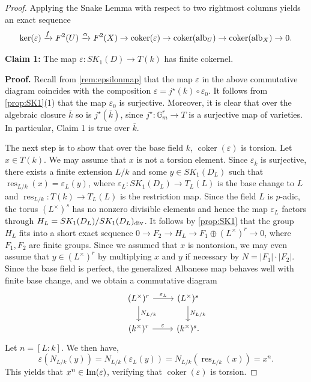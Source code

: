 \documentclass[12pt]{amsart}
\theoremstyle{remark}
\newcommand{\G}{{\mathbb G}}
\renewcommand{\1}{{\mathbb{S}}}
\newcommand{\alb}{{\rm alb}}
\newcommand{\<}{\langle}
\renewcommand{\>}{\rangle}
\newcommand{\res}{{\operatorname{res}}}
\newcommand{\cok}{{\operatorname{coker}}}
\newcommand{\img}{{\rm Im}}
\newcommand{\dv}{{\rm div}}
\begin{document}
\begin{proof}
 Applying the Snake Lemma with respect to 
two rightmost columns yields an exact sequence 
\begin{equation}\label{eq3}
\ker(\varepsilon)\xrightarrow{f} F^2(U)\xrightarrow{\alpha} F^2(X)\to\cok(\varepsilon)\to\cok(\alb_U)\to\cok(\alb_X)\to 0.
\end{equation}


\textbf{Claim 1:} The map $\varepsilon: SK_1(D)\to T(k)$ has finite cokernel. 



\textbf{Proof.} 
Recall from \autoref{rem:epsilonmap} that the map $\varepsilon$ in the above commutative diagram coincides with the composition $\varepsilon=j^\star(k)\circ\varepsilon_0$. It follows from \autoref{prop:SK1}(1) that the map $\varepsilon_0$ is surjective. Moreover, it is clear that over the algebraic closure $\overline{k}$ so is $j^\star(\overline{k})$, since $j^\star:\G_m^{r}\to T$ is a surjective map of varieties. In particular,  Claim 1 is true over $\overline{k}$.


The next step is to show that over the base field $k$, $\cok(\varepsilon)$ is torsion. Let $x\in T(k)$. We may assume that $x$ is not a torsion element. 
Since $\varepsilon_{\overline{k}}$ is surjective, there exists a finite extension $L/k$ and some $y\in SK_1(D_L)$ such that $\res_{L/k}(x)=\varepsilon_L(y)$, where $\varepsilon_L:SK_1(D_L)\to T_L(L)$ is the base change to $L$ and $\res_{L/k}:T(k)\to T_L(L)$ is the restriction map. 
Since the field $L$ is $p$-adic, the torus $(L^\times)^s$ has no nonzero divisible elements and hence the map $\varepsilon_L$ factors through $H_L=SK_1(D_L)/SK_1(D_L)_{\dv}$. It follows by \autoref{prop:SK1} that the group $H_L$ fits into a short exact sequence $0\to F_2\to H_L\to F_1\oplus (L^\times)^r\to 0$, where $F_1, F_2$ are finite groups. Since we assumed that $x$ is nontorsion, we may even assume that $y\in (L^\times)^r$ by multiplying $x$ and $y$ if necessary by $N=|F_1|\cdot|F_2|$. Since the base field is perfect, the generalized Albanese map behaves well with finite base change, and we obtain a commutative diagram
\[
\begin{tikzcd}
&   (L^\times)^r \arrow[r, "\varepsilon_L"] \arrow[d, "N_{L/k}"]  & (L^\times)^s \arrow[d, "N_{L/k}"] \\
&  (k^\times)^r \arrow[r, "\varepsilon"]   & (k^\times)^s.
\end{tikzcd}
\] Let $n=[L:k]$. We then have,
\[\varepsilon(N_{L/k}(y))=N_{L/k}(\varepsilon_L(y))=N_{L/k}(\res_{L/k}(x))=x^n.\] This yields that $x^n\in\img(\varepsilon)$, verifying that $\cok(\varepsilon)$ is torsion. 


\end{proof}
\end{document}
